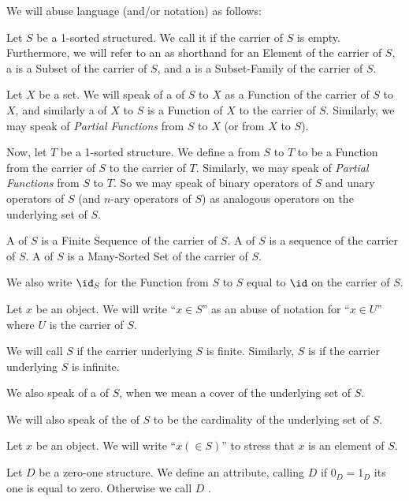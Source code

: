 \begin{remark}
We will abuse language (and/or notation) as follows:

Let $S$ be a 1-sorted structured. We call it  if the
carrier of $S$ is empty. Furthermore, we will refer to an
 as shorthand for an Element of the carrier of $S$,
a  is a Subset of the carrier of $S$, and a
 is a Subset-Family of the carrier of $S$.

Let $X$ be a set. We will speak of a  of $S$ to $X$
as a Function of the carrier of $S$ to $X$, and similarly a
 of $X$ to $S$ is a Function of $X$ to the carrier of $S$.
Similarly, we may speak of \emph{Partial Functions} from $S$ to $X$
(or from $X$ to $S$).

Now, let $T$ be a 1-sorted structure. We define a 
from $S$ to $T$ to be a Function from the carrier of $S$ to the
carrier of $T$. Similarly, we may speak of \emph{Partial Functions}
from $S$ to $T$. So we may speak of binary operators of $S$ and unary
operators of $S$ (and $n$-ary operators of $S$) as analogous operators
on the underlying set of $S$.

A  of $S$ is a Finite Sequence of the carrier
of $S$. A  of $S$ is a sequence of the carrier of $S$.
A  of $S$ is a Many-Sorted Set of the
carrier of $S$.

We also write $\id_{S}$ for the Function from $S$ to $S$ equal to
$\id$ on the carrier of $S$.

Let $x$ be an object. We will write ``$x\in S$'' as an abuse of
notation for ``$x\in U$'' where $U$ is the carrier of $S$.

We will call $S$  if the carrier underlying $S$ is
finite. Similarly, $S$ is  if the carrier underlying
$S$ is infinite.

We also speak of a  of $S$, when we mean a cover of the
underlying set of $S$.

We will also speak of the  of $S$ to be the
cardinality of the underlying set of $S$.

Let $x$ be an object. We will write ``$x(\in S)$'' to stress that $x$ is
an element of $S$.
\end{remark}

\begin{definition}
Let $D$ be a zero-one structure. We define an attribute, calling
$D$  if $0_{D}=1_{D}$ its one is equal to
zero. Otherwise we call $D$ .
\end{definition}

